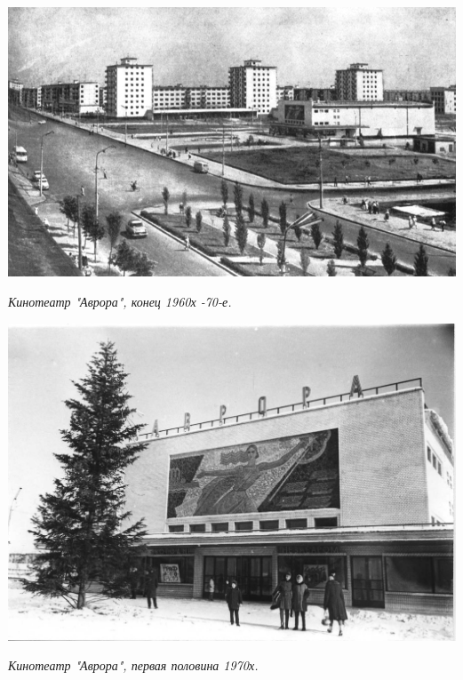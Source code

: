 \newpage

\vspace*{\fill}


\begin{center}
\includegraphics[width=\linewidth]{lpix/avrova-1960x.jpg}

\textit{Кинотеатр "Аврора", конец 1960х -70-е.}
\end{center}

\begin{center}
\includegraphics[width=\linewidth]{lpix/avrora-1970-75.jpg}

\textit{Кинотеатр "Аврора", первая половина 1970х.}
\end{center}


\vspace*{\fill}

\newpage


